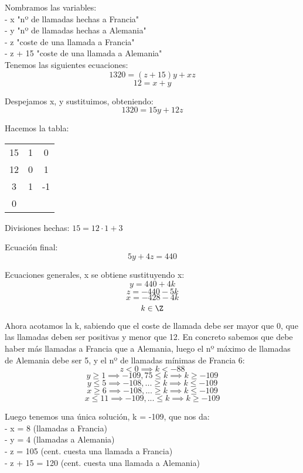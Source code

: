 \documentclass[11pt, a4paper, titlepage]{article}
\begin{document}
Nombramos las variables: \\
- x \equiv "nº de llamadas hechas a Francia" \\
- y \equiv "nº de llamadas hechas a Alemania" \\
- z \equiv "coste de una llamada a Francia" \\
- z + 15 \equiv "coste de una llamada a Alemania" \\

Tenemos las siguientes ecuaciones:
$$ 1320 = (z + 15)y + xz $$
$$ 12 = x + y $$

Despejamos x, y sustituimos, obteniendo:
$$ 1320 = 15y + 12z $$

Hacemos la tabla:

\begin{center}
\begin{tabular}{c|cc}
15 & 1 & 0 \\
12 & 0 & 1 \\
\hline
3 & 1 & -1 \\
\hline
0
\end{tabular}
\end{center}

Divisiones hechas: $ 15 = 12 \cdot 1 + 3 $

Ecuación final:
$$ 5y + 4z = 440 $$

Ecuaciones generales, x se obtiene sustituyendo x:
$$ y = 440 + 4k $$
$$ z = -440 - 5k $$
$$ x = -428 - 4k $$
$$ k \in \Z $$

Ahora acotamos la k, sabiendo que el coste de llamada debe ser mayor que 0, que las llamadas deben ser positivas y menor que 12. En concreto sabemos que debe haber más llamadas a Francia que a Alemania, luego el nº máximo de llamadas de Alemania debe ser 5, y el nº de llamadas mínimas de Francia 6:
$$ z < 0 \implies k < -88 $$
$$ y \geq 1 \implies -109,75 \leq k \implies k \geq -109 $$
$$ y \leq 5 \implies -108,... \geq k \implies k \leq -109 $$
$$ x \geq 6 \implies -108,... \geq k \implies k \leq -109 $$
$$ x \leq 11 \implies -109,... \leq k \implies k \geq -109 $$

Luego tenemos una única solución, k = -109, que nos da: \\
- x = 8 (llamadas a Francia) \\
- y = 4 (llamadas a Alemania) \\
- z = 105 (cent. cuesta una llamada a Francia) \\
- z + 15 = 120 (cent. cuesta una llamada a Alemania) \\
\end{document}
